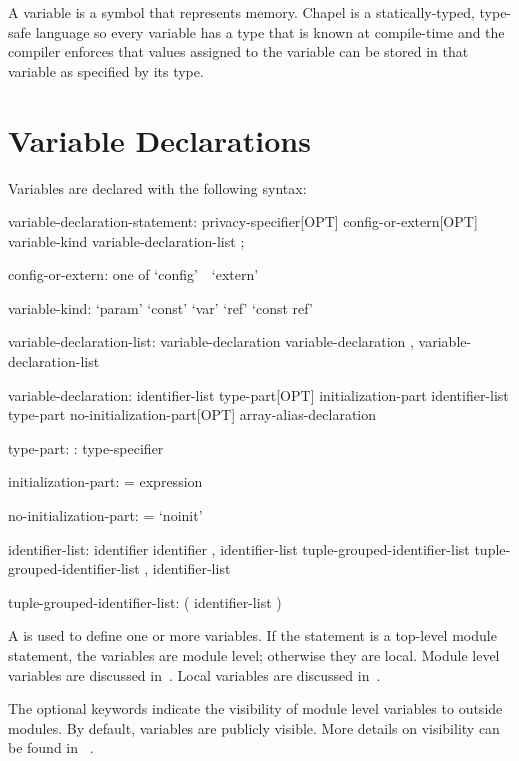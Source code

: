 \label{Variables}

A variable is a symbol that represents memory.  Chapel is a
statically-typed, type-safe language so every variable has a type that
is known at compile-time and the compiler enforces that values
assigned to the variable can be stored in that variable as specified
by its type.

\section{Variable Declarations}
\label{Variable_Declarations}

Variables are declared with the following syntax:
\begin{syntax}
variable-declaration-statement:
  privacy-specifier[OPT] config-or-extern[OPT] variable-kind variable-declaration-list ;

config-or-extern: one of
  `config' $ $ $ $ `extern'

variable-kind:
  `param'
  `const'
  `var'
  `ref'
  `const ref'

variable-declaration-list:
  variable-declaration
  variable-declaration , variable-declaration-list

variable-declaration:
  identifier-list type-part[OPT] initialization-part
  identifier-list type-part no-initialization-part[OPT]
  array-alias-declaration

type-part:
  : type-specifier

initialization-part:
  = expression

no-initialization-part:
  = `noinit'

identifier-list:
  identifier
  identifier , identifier-list
  tuple-grouped-identifier-list
  tuple-grouped-identifier-list , identifier-list

tuple-grouped-identifier-list:
  ( identifier-list )
\end{syntax}
A  is used to define one or more
variables.  If the statement is a top-level module statement, the
variables are module level; otherwise they are local.  Module level variables are
discussed in~.  Local variables are discussed
in~.

The optional  keywords indicate the visibility
of module level variables to outside modules.  By default, variables
are publicly visible.  More details on visibility can be found in
~.


